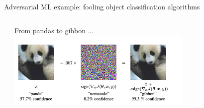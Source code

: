 \begin{frame}{Adversarial ML example: fooling object classification algorithms}
  \begin{columns}[T] %
    \begin{column}{.3\textwidth}

      \begin{center}
      \end{center}
      \cite{goodfellow2014explaining}\newline

    \end{column}%
    \begin{column}{.7\textwidth}
      \begin{center}
        From pandas to gibbon ...
        \includegraphics[width=0.7\textwidth]{graphics/gibbon-for-panda}
        \end{center}
    \end{column}%
\end{columns}
\end{frame}

